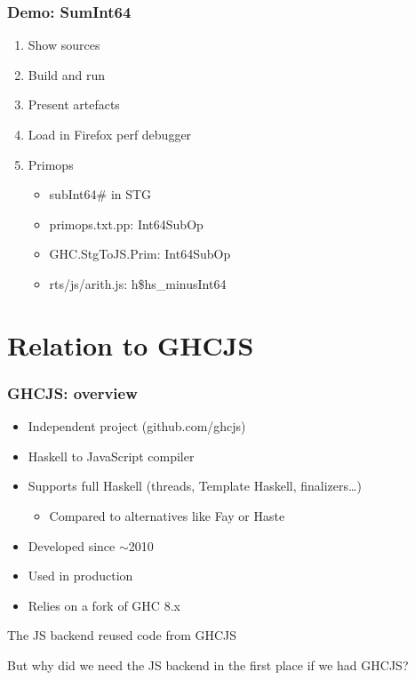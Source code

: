 \documentclass[aspectratio=169]{beamer}
\begin{document}
\begin{frame}
\frametitle{Demo: SumInt64}
\begin{enumerate}
\item Show sources
\item Build and run
\item Present artefacts
\item Load in Firefox perf debugger
\item Primops
  \begin{itemize}
    \item subInt64\# in STG
    \item primops.txt.pp: Int64SubOp
    \item GHC.StgToJS.Prim: Int64SubOp
    \item rts/js/arith.js: h\$hs\_minusInt64
  \end{itemize}
\end{enumerate}
\end{frame}

\section{Relation to GHCJS}

\begin{frame}
\frametitle{GHCJS: overview}
\begin{itemize}
\item Independent project (github.com/ghcjs)
\item Haskell to JavaScript compiler
\item Supports full Haskell (threads, Template Haskell, finalizers…)
\begin{itemize}
\item Compared to alternatives like Fay or Haste
\end{itemize}
\item Developed since $\sim$2010
\item Used in production
\item Relies on a fork of GHC 8.x
\end{itemize}
\begin{center}
\alert{The JS backend reused code from GHCJS}
\end{center}
But why did we need the JS backend in the first place if we had GHCJS?
\end{frame}
\end{document}
